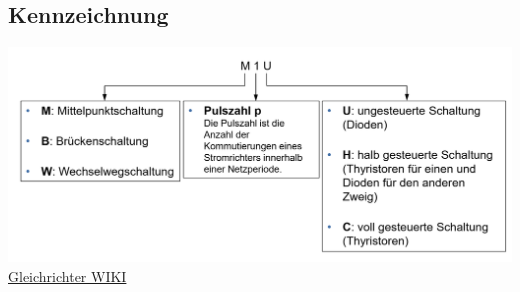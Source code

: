 \subsection{Kennzeichnung}
\includegraphics[width=0.9\linewidth]{images/SRKennzeichnung}\newline
\href{https://de.wikipedia.org/wiki/Gleichrichter}{Gleichrichter WIKI}

\clearpage